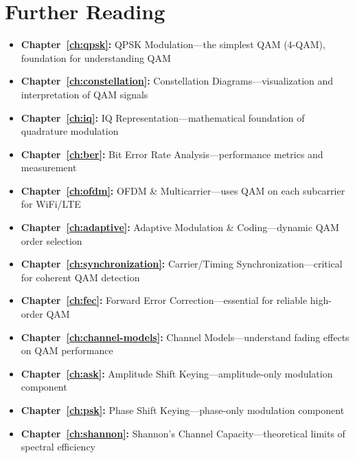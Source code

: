 \section{Further Reading}

\begin{itemize}
\item \textbf{Chapter~\ref{ch:qpsk}:} QPSK Modulation---the simplest QAM (4-QAM), foundation for understanding QAM
\item \textbf{Chapter~\ref{ch:constellation}:} Constellation Diagrams---visualization and interpretation of QAM signals
\item \textbf{Chapter~\ref{ch:iq}:} IQ Representation---mathematical foundation of quadrature modulation
\item \textbf{Chapter~\ref{ch:ber}:} Bit Error Rate Analysis---performance metrics and measurement
\item \textbf{Chapter~\ref{ch:ofdm}:} OFDM \& Multicarrier---uses QAM on each subcarrier for WiFi/LTE
\item \textbf{Chapter~\ref{ch:adaptive}:} Adaptive Modulation \& Coding---dynamic QAM order selection
\item \textbf{Chapter~\ref{ch:synchronization}:} Carrier/Timing Synchronization---critical for coherent QAM detection
\item \textbf{Chapter~\ref{ch:fec}:} Forward Error Correction---essential for reliable high-order QAM
\item \textbf{Chapter~\ref{ch:channel-models}:} Channel Models---understand fading effects on QAM performance
\item \textbf{Chapter~\ref{ch:ask}:} Amplitude Shift Keying---amplitude-only modulation component
\item \textbf{Chapter~\ref{ch:psk}:} Phase Shift Keying---phase-only modulation component
\item \textbf{Chapter~\ref{ch:shannon}:} Shannon's Channel Capacity---theoretical limits of spectral efficiency
\end{itemize}
